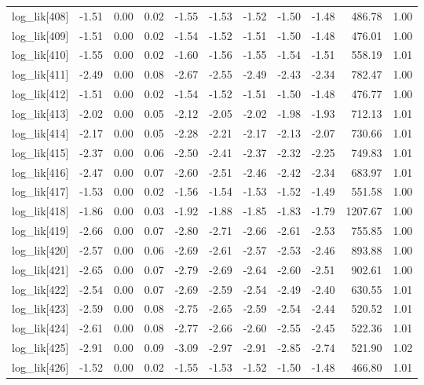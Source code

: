 \begin{table}[ht]
\begin{tabular}{rrrrrrrrrrr}
  log\_lik[408] & -1.51 & 0.00 & 0.02 & -1.55 & -1.53 & -1.52 & -1.50 & -1.48 & 486.78 & 1.00 \\ 
  log\_lik[409] & -1.51 & 0.00 & 0.02 & -1.54 & -1.52 & -1.51 & -1.50 & -1.48 & 476.01 & 1.00 \\ 
  log\_lik[410] & -1.55 & 0.00 & 0.02 & -1.60 & -1.56 & -1.55 & -1.54 & -1.51 & 558.19 & 1.01 \\ 
  log\_lik[411] & -2.49 & 0.00 & 0.08 & -2.67 & -2.55 & -2.49 & -2.43 & -2.34 & 782.47 & 1.00 \\ 
  log\_lik[412] & -1.51 & 0.00 & 0.02 & -1.54 & -1.52 & -1.51 & -1.50 & -1.48 & 476.77 & 1.00 \\ 
  log\_lik[413] & -2.02 & 0.00 & 0.05 & -2.12 & -2.05 & -2.02 & -1.98 & -1.93 & 712.13 & 1.01 \\ 
  log\_lik[414] & -2.17 & 0.00 & 0.05 & -2.28 & -2.21 & -2.17 & -2.13 & -2.07 & 730.66 & 1.01 \\ 
  log\_lik[415] & -2.37 & 0.00 & 0.06 & -2.50 & -2.41 & -2.37 & -2.32 & -2.25 & 749.83 & 1.01 \\ 
  log\_lik[416] & -2.47 & 0.00 & 0.07 & -2.60 & -2.51 & -2.46 & -2.42 & -2.34 & 683.97 & 1.01 \\ 
  log\_lik[417] & -1.53 & 0.00 & 0.02 & -1.56 & -1.54 & -1.53 & -1.52 & -1.49 & 551.58 & 1.00 \\ 
  log\_lik[418] & -1.86 & 0.00 & 0.03 & -1.92 & -1.88 & -1.85 & -1.83 & -1.79 & 1207.67 & 1.00 \\ 
  log\_lik[419] & -2.66 & 0.00 & 0.07 & -2.80 & -2.71 & -2.66 & -2.61 & -2.53 & 755.85 & 1.00 \\ 
  log\_lik[420] & -2.57 & 0.00 & 0.06 & -2.69 & -2.61 & -2.57 & -2.53 & -2.46 & 893.88 & 1.00 \\ 
  log\_lik[421] & -2.65 & 0.00 & 0.07 & -2.79 & -2.69 & -2.64 & -2.60 & -2.51 & 902.61 & 1.00 \\ 
  log\_lik[422] & -2.54 & 0.00 & 0.07 & -2.69 & -2.59 & -2.54 & -2.49 & -2.40 & 630.55 & 1.01 \\ 
  log\_lik[423] & -2.59 & 0.00 & 0.08 & -2.75 & -2.65 & -2.59 & -2.54 & -2.44 & 520.52 & 1.01 \\ 
  log\_lik[424] & -2.61 & 0.00 & 0.08 & -2.77 & -2.66 & -2.60 & -2.55 & -2.45 & 522.36 & 1.01 \\ 
  log\_lik[425] & -2.91 & 0.00 & 0.09 & -3.09 & -2.97 & -2.91 & -2.85 & -2.74 & 521.90 & 1.02 \\ 
  log\_lik[426] & -1.52 & 0.00 & 0.02 & -1.55 & -1.53 & -1.52 & -1.50 & -1.48 & 466.80 & 1.01 \\ 

\end{tabular}
\end{table}
